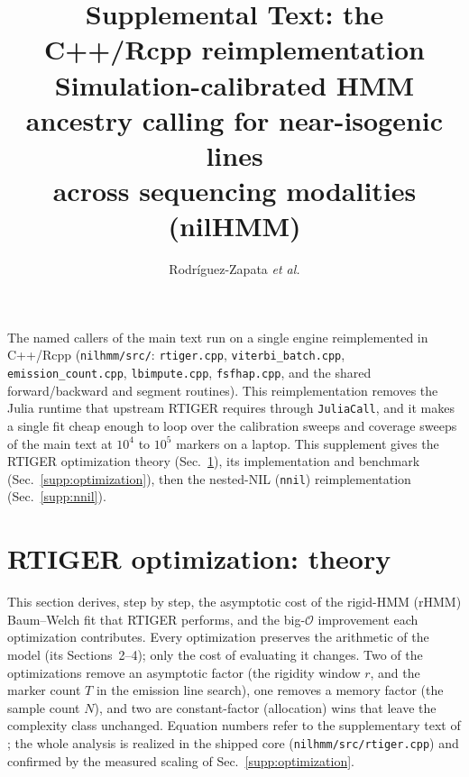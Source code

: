 \documentclass[11pt]{article}
\title{Supplemental Text: the C++/Rcpp reimplementation\\[2pt]
\large Simulation-calibrated HMM ancestry calling for near-isogenic lines\\
across sequencing modalities (nilHMM)}
\author{Rodr\'iguez-Zapata \textit{et al.}}
\date{}
\newcommand{\code}[1]{\texttt{#1}}
\newcommand{\bigO}{\mathcal{O}}
\providecommand{\nnil}{\texttt{nnil}\xspace}
\begin{document}
\maketitle

\begin{sloppypar}\relax
The named callers of the main text run on a single engine reimplemented in
C++/Rcpp (\code{nilhmm/src/}: \code{rtiger.cpp}, \code{viterbi\_batch.cpp},
\code{emission\_count.cpp}, \code{lbimpute.cpp}, \code{fsfhap.cpp}, and the shared
forward/backward and segment routines). This reimplementation removes the Julia
runtime that upstream RTIGER \citep{rtiger_2023} requires through
\code{JuliaCall}, and it makes a single fit cheap enough to loop over the
calibration sweeps and coverage sweeps of the main text at $10^4$ to $10^5$
markers on a laptop. This supplement gives the RTIGER optimization theory
(Sec.~\ref{supp:theory}), its implementation and benchmark
(Sec.~\ref{supp:optimization}), then the nested-NIL (\nnil) reimplementation
(Sec.~\ref{supp:nnil}).
\end{sloppypar}

\section{RTIGER optimization: theory}
\label{supp:theory}

This section derives, step by step, the asymptotic cost of the rigid-HMM (rHMM)
Baum--Welch fit that RTIGER performs, and the big-$\bigO$ improvement each
optimization contributes. Every optimization preserves the arithmetic of the model
\citep{rtiger_2023} (its Sections~2--4); only the cost of evaluating it changes. Two
of the optimizations remove an asymptotic factor (the rigidity window $r$, and the
marker count $T$ in the emission line search), one removes a memory factor (the
sample count $N$), and two are constant-factor (allocation) wins that leave the
complexity class unchanged. Equation numbers refer to the supplementary text of
\citet{rtiger_2023}; the whole analysis is realized in the shipped core
(\code{nilhmm/src/rtiger.cpp}) and confirmed by the measured scaling of
Sec.~\ref{supp:optimization}.
\end{document}
